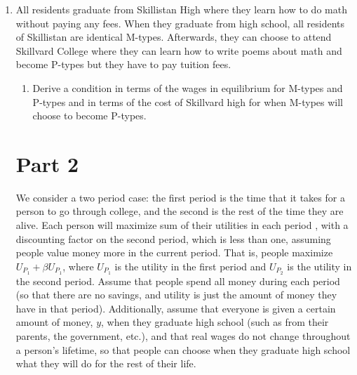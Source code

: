 \documentclass[12pt]{article}
\begin{document}
\begin{enumerate}
	\item{All residents graduate from Skillistan High where they learn how to do math without
paying any fees. When they graduate from high school, all residents of Skillistan are
identical M-types. Afterwards, they can choose to attend Skillvard College where
they can learn how to write poems about math and become P-types but they have
to pay tuition fees.}

\begin{enumerate}

	\item{Derive a condition in terms of the wages in equilibrium for M-types and P-types
and in terms of the cost of Skillvard high for when M-types will choose to become
P-types.}

\end{enumerate}

\section*{Part 2}

We consider a two period case: the first period is the time that it takes for a person to go through college, and the second is the rest of the time they are alive.  Each person will maximize sum of their utilities in each period , with a discounting factor on the second period, which is less than one, assuming people value money more in the current period.  That is, people maximize $U_{P_1} + \beta U_{P_1}$, where $U_{P_1}$ is the utility in the first period and $U_{P_2}$ is the utility in the second period.  Assume that people spend all money during each period (so that there are no savings, and utility is just the amount of money they have in that period).  Additionally, assume that everyone is given a certain amount of money, $y$, when they graduate high school (such as from their parents, the government, etc.), and that real wages do not change throughout a person's lifetime, so that people can choose when they graduate high school what they will do for the rest of their life.  


\end{enumerate}
\end{document}
